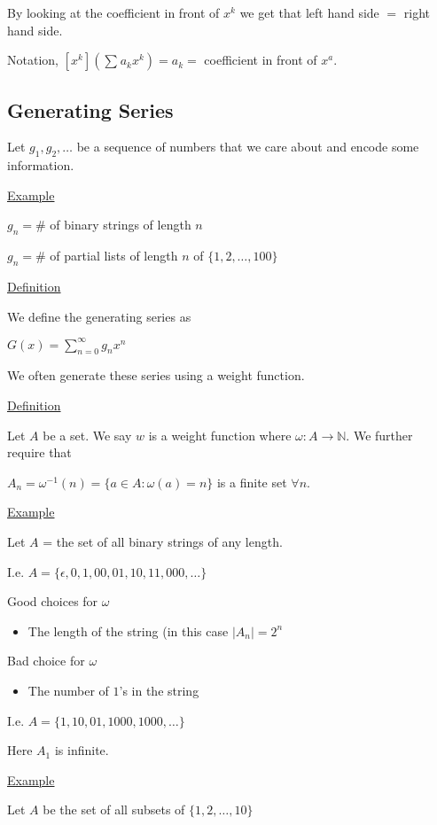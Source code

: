 \documentclass{article}
\begin{document}
By looking at the coefficient in front of $x^k$ we get that left hand side $=$ right hand side. 

Notation, $[x^k](\sum_{}^{}a_kx^k) = a_k =$ coefficient in front of $ x^a$.

\subsection{Generating Series}

Let $g_1, g_2, \ldots$ be a sequence of numbers that we care about and encode some information. 

\underline{Example}

$g_n = \#$ of binary strings of length $n$

$g_n = \#$ of partial lists of length $n$ of $\{1,2,\ldots,100\}$

\underline{Definition}

We define the generating series as

$G(x) = \sum_{n=0}^{\infty}g_nx^n$

We often generate these series using a weight function.

\underline{Definition}

Let $A$ be a set. We say $w$ is a weight function where $\omega: A \to \mathbb{N}$. We further require that 

$A_n = \omega^{-1}(n) = \{a \in A: \omega(a) = n\}$ is a finite set $\forall n$.

\underline{Example}

Let $A$ = the set of all binary strings of any length. 

I.e. $A = \{\epsilon, 0, 1, 00, 01, 10, 11, 000, \ldots \}$

Good choices for $\omega$
\begin{itemize}
    \item The length of the string (in this case $|A_n| = 2^n$
\end{itemize}

Bad choice for $\omega$
\begin{itemize}
    \item The number of $1$'s in the string
\end{itemize}

I.e. $A = \{1,10,01,1000,1000,\ldots\}$

Here $A_1$ is infinite.

\underline{Example}

Let $A$ be the set of all subsets of $\{1,2,\ldots,10\}$
\end{document}
